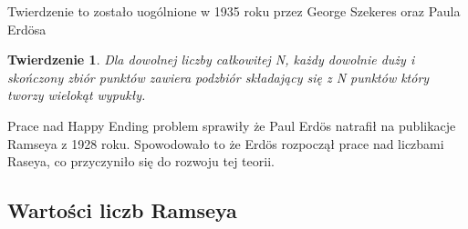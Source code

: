 \documentclass[11pt]{article}
\newtheorem{theorem}{Twierdzenie}
\begin{document}
Twierdzenie to zostało uogólnione w 1935 roku przez George Szekeres oraz Paula Erd\"osa

\begin{theorem}
Dla dowolnej liczby całkowitej N, każdy dowolnie duży i skończony zbiór punktów zawiera podzbiór składający się z N punktów który tworzy wielokąt wypukły. \cite{erdoshappy} 
\end{theorem}

Prace nad Happy Ending problem sprawiły że Paul Erd\"os natrafił na publikacje Ramseya z 1928 roku. Spowodowało to że Erd\"os rozpoczął prace nad liczbami Raseya, co przyczyniło się do rozwoju tej teorii.

\subsection{Wartości liczb Ramseya}
\end{document}
